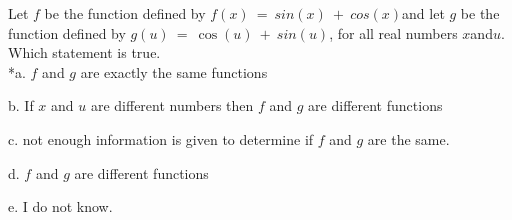 
Let \(f\) be the function defined by
\(f(x)\  = \ sin(x)\  + \ cos(x)\)and let \(g\) be the function defined
by \(g(u)\  = \ \cos(u)\  + \ sin(u)\), for all real numbers
\(x\)and\(u\). Which statement is true.\\

*a. \(f\) and \(g\) are exactly the same functions

b. If \(x\) and \(u\) are different numbers then \(f\) and \(g\) are
different functions

c. not enough information is given to determine if \(f\) and \(g\) are
the same.

d. \(f\) and \(g\) are different functions

e. I do not know.\\
